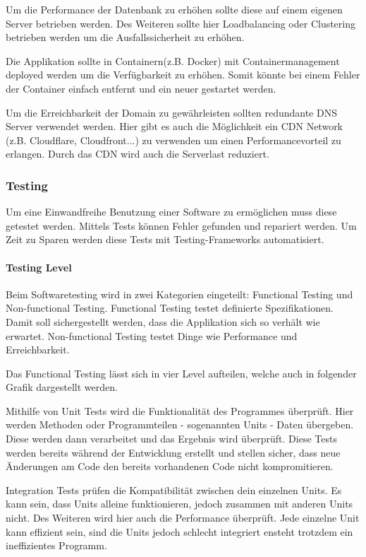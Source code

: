 Um die Performance der Datenbank zu erhöhen sollte diese auf einem eigenen Server betrieben werden. Des Weiteren sollte hier Loadbalancing oder Clustering betrieben werden um die Ausfallssicherheit zu erhöhen. 

Die Applikation sollte in Containern(z.B. Docker) mit Containermanagement deployed werden um die Verfügbarkeit zu erhöhen. Somit könnte bei einem Fehler der Container einfach entfernt und ein neuer gestartet werden. 

Um die Erreichbarkeit der Domain zu gewährleisten sollten redundante DNS Server verwendet werden. Hier gibt es auch die Möglichkeit ein CDN Network (z.B. Cloudflare, Cloudfront...) zu verwenden um einen Performancevorteil zu erlangen. Durch das CDN wird auch die Serverlast reduziert.

\subsubsection{Testing}
Um eine Einwandfreihe Benutzung einer Software zu ermöglichen muss diese getestet werden. Mittels Tests können Fehler gefunden und repariert werden. Um Zeit zu Sparen werden diese Tests mit Testing-Frameworks automatisiert.

\paragraph{Testing Level}
Beim Softwaretesting wird in zwei Kategorien eingeteilt: Functional Testing und Non-functional Testing. Functional Testing testet definierte Spezifikationen. Damit soll sichergestellt werden, dass die Applikation sich so verhält wie erwartet. Non-functional Testing testet Dinge wie Performance und Erreichbarkeit.\cite{TESTING1}

Das Functional Testing lässt sich in vier Level aufteilen, welche auch in folgender Grafik dargestellt werden.


Mithilfe von Unit Tests wird die Funktionalität des Programmes überprüft. Hier werden Methoden oder Programmteilen - sogenannten Units - Daten übergeben. Diese werden dann verarbeitet und das Ergebnis wird überprüft. Diese Tests werden bereits während der Entwicklung erstellt und stellen sicher, dass neue Änderungen am Code den bereits vorhandenen Code nicht kompromitieren. \cite{TESTING3}

Integration Tests prüfen die Kompatibilität zwischen dein einzelnen Units. Es kann sein, dass Units alleine funktionieren, jedoch zusammen mit anderen Units nicht. Des Weiteren wird hier auch die Performance überprüft. Jede einzelne Unit kann effizient sein, sind die Units jedoch schlecht integriert ensteht trotzdem ein ineffizientes Programm. \cite{TESTING3}

